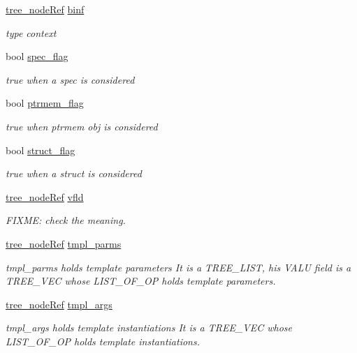 \begin{DoxyCompactItemize}
\hyperlink{tree__node_8hpp_a6ee377554d1c4871ad66a337eaa67fd5}{tree\+\_\+node\+Ref} \hyperlink{structrecord__type_a8adeab31b63af188461369fc86d94b38}{binf}
\begin{DoxyCompactList}\small\item\em type context \end{DoxyCompactList}\item 
bool \hyperlink{structrecord__type_a7bf17170ab3c31e2c8e9672dbc2e9475}{spec\+\_\+flag}
\begin{DoxyCompactList}\small\item\em true when a spec is considered \end{DoxyCompactList}\item 
bool \hyperlink{structrecord__type_a218c3e670e70a9f7aa1745d556a06784}{ptrmem\+\_\+flag}
\begin{DoxyCompactList}\small\item\em true when ptrmem obj is considered \end{DoxyCompactList}\item 
bool \hyperlink{structrecord__type_a097e84b53523c838bdc8ff4324ba013a}{struct\+\_\+flag}
\begin{DoxyCompactList}\small\item\em true when a struct is considered \end{DoxyCompactList}\item 
\hyperlink{tree__node_8hpp_a6ee377554d1c4871ad66a337eaa67fd5}{tree\+\_\+node\+Ref} \hyperlink{structrecord__type_a6fa6730c5f59752e895c7c8371edc96b}{vfld}
\begin{DoxyCompactList}\small\item\em F\+I\+X\+ME\+: check the meaning. \end{DoxyCompactList}\item 
\hyperlink{tree__node_8hpp_a6ee377554d1c4871ad66a337eaa67fd5}{tree\+\_\+node\+Ref} \hyperlink{structrecord__type_abfade04fea376341e3ed1811059f6822}{tmpl\+\_\+parms}
\begin{DoxyCompactList}\small\item\em tmpl\+\_\+parms holds template parameters It is a T\+R\+E\+E\+\_\+\+L\+I\+ST, his V\+A\+LU field is a T\+R\+E\+E\+\_\+\+V\+EC whose L\+I\+S\+T\+\_\+\+O\+F\+\_\+\+OP holds template parameters. \end{DoxyCompactList}\item 
\hyperlink{tree__node_8hpp_a6ee377554d1c4871ad66a337eaa67fd5}{tree\+\_\+node\+Ref} \hyperlink{structrecord__type_a51e97437eacc6da88f6cae72a2423d69}{tmpl\+\_\+args}
\begin{DoxyCompactList}\small\item\em tmpl\+\_\+args holds template instantiations It is a T\+R\+E\+E\+\_\+\+V\+EC whose L\+I\+S\+T\+\_\+\+O\+F\+\_\+\+OP holds template instantiations. \end{DoxyCompactList}\end{DoxyCompactItemize}

